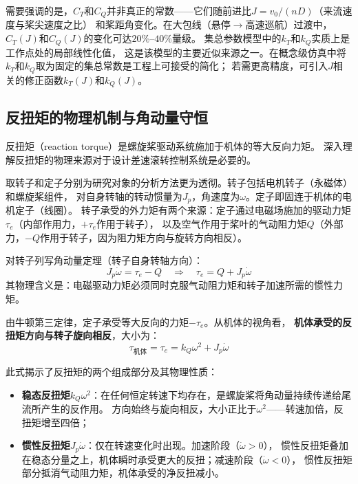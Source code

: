 需要强调的是，$C_T$和$C_Q$并非真正的常数——它们随前进比$J = v_0/(nD)$（来流速度与桨尖速度之比）
和桨距角变化。在大包线（悬停$\to$高速巡航）过渡中，$C_T(J)$和$C_Q(J)$的变化可达$20\%$--$40\%$量级。
集总参数模型中的$k_T$和$k_Q$实质上是工作点处的局部线性化值，
这是该模型的主要近似来源之一。在概念级仿真中将$k_T$和$k_Q$取为固定的集总常数是工程上可接受的简化；
若需更高精度，可引入$J$相关的修正函数$k_T(J)$和$k_Q(J)$。

\subsection{反扭矩的物理机制与角动量守恒}

反扭矩（reaction torque）是螺旋桨驱动系统施加于机体的等大反向力矩。
深入理解反扭矩的物理来源对于设计差速滚转控制系统是必要的。

取转子和定子分别为研究对象的分析方法更为透彻。转子包括电机转子（永磁体）和螺旋桨组件，
对自身转轴的转动惯量为$J_p$，角速度为$\omega$。定子即固连于机体的电机定子（线圈）。
转子承受的外力矩有两个来源：定子通过电磁场施加的驱动力矩$\tau_e$（内部作用力，$+\tau_e$作用于转子），
以及空气作用于桨叶的气动阻力矩$Q$（外部力，$-Q$作用于转子，因为阻力矩方向与旋转方向相反）\cite{ducard2011fault}。

对转子列写角动量定理（转子自身转轴方向）：
\begin{equation}
    J_p \dot{\omega} = \tau_e - Q \quad\Longrightarrow\quad
    \tau_e = Q + J_p \dot{\omega}
    \label{eq:rotor_angular}
\end{equation}
其物理含义是：电磁驱动力矩必须同时克服气动阻力矩和转子加速所需的惯性力矩。

由牛顿第三定律，定子承受等大反向的力矩$-\tau_e$。从机体的视角看，
\textbf{机体承受的反扭矩方向与转子旋向相反}，大小为：
\begin{equation}
    \boxed{\tau_{\text{机体}} = \tau_e = k_Q \omega^2 + J_p \dot{\omega}}
    \label{eq:reaction_torque}
\end{equation}

此式揭示了反扭矩的两个组成部分及其物理性质：
\begin{itemize}
    \item \textbf{稳态反扭矩}$k_Q \omega^2$：在任何恒定转速下均存在，是螺旋桨将角动量持续传递给尾流所产生的反作用。
          方向始终与旋向相反，大小正比于$\omega^2$——转速加倍，反扭矩增至四倍；
    \item \textbf{惯性反扭矩}$J_p \dot{\omega}$：仅在转速变化时出现。加速阶段（$\dot{\omega} > 0$），
         惯性反扭矩叠加在稳态分量之上，机体瞬时承受更大的反扭；减速阶段（$\dot{\omega} < 0$），
         惯性反扭矩部分抵消气动阻力矩，机体承受的净反扭减小。
\end{itemize}

